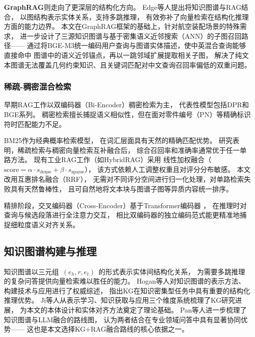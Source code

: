 \textbf{GraphRAG}则走向了更深层的结构化方向。
Edge等人\cite{edge2024graphrag}提出将知识图谱与RAG结合，
以图结构表示实体关系，支持多跳推理，
有效弥补了向量检索在结构化推理方面的能力边界。
本文在GraphRAG框架的基础上，针对航空装配场景的特殊需求，
进一步设计了三源知识图谱与基于密集语义近邻搜索（ANN）的子图召回路径——
通过将BGE-M3统一编码用户查询与图谱实体描述，使中英混合查询能够直接命中
图谱中的语义近邻锚点，再以一跳邻域扩展提取相关子图，
解决了纯文本图谱无法覆盖几何约束知识、且关键词匹配对中文查询召回率偏低的双重问题。

\subsubsection{稀疏-稠密混合检索}

早期RAG工作以双编码器（Bi-Encoder）稠密检索为主，
代表性模型包括DPR\cite{karpukhin2020dpr}和BGE系列\cite{bge2023}。
稠密检索擅长捕捉语义相似性，但在面对零件编号（PN）等精确标识符时匹配能力不足。

BM25\cite{robertson2009bm25}作为经典概率检索模型，
在词汇层面具有天然的精确匹配优势。
研究表明，稀疏检索与稠密向量检索互补融合后，
综合召回率和准确率通常优于任一单路方法\cite{luan2021sparse}。
现有工业RAG工作（如HybridRAG\cite{shen2025hybridrag}）采用
线性加权融合（$\text{score} = \alpha \cdot s_{\text{dense}} + \beta \cdot s_{\text{sparse}}$），
该方式依赖人工调整权重且对评分分布敏感。
本文改用互惠排名融合（RRF）\cite{cormack2009rrf}，
无需对不同评分空间进行归一化处理，对单路检索失败具有天然鲁棒性，
且可自然地将文本块与图谱子图等异质内容统一排序。

精排阶段，交叉编码器（Cross-Encoder）基于Transformer编码器
\cite{vaswani2017attention,devlin2019bert}，
在推理时对查询与候选段落进行全注意力交互，
相比双编码器的独立编码范式能更精准地捕捉细粒度语义对齐关系\cite{nogueira2019passage}。

\subsection{知识图谱构建与推理}
\label{sec:related-kg}

知识图谱以三元组~$(e_h, r, e_t)$~的形式表示实体间结构化关系，
为需要多跳推理的复杂问答提供向量检索难以胜任的能力。
Hogan等人\cite{hogan2021kg}对知识图谱的表示方法、构建技术与应用进行了权威综述，
指出KG在知识密集型任务中具有重要的结构化推理优势。
Ji等人\cite{ji2022kgsurvey}从表示学习、知识获取与应用三个维度系统梳理了KG研究进展，
为本文的本体设计和实体对齐方法奠定了理论基础。
Pan等人\cite{pan2024kgllmsurvey}进一步梳理了知识图谱与LLM融合的路线图，
认为两者结合在专业领域问答中具有显著协同优势——
这也是本文选择KG+RAG融合路线的核心依据之一。

